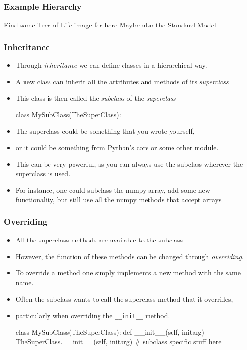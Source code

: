 \documentclass{beamer}
\begin{document}
\begin{frame}[fragile]
\frametitle{Example Hierarchy}
Find some Tree of Life image for here
Maybe also the Standard Model

\end{frame}

\begin{frame}[fragile]
\frametitle{Inheritance}
\begin{itemize}
\item Through \emph{inheritance} we can define classes in a hierarchical way.
\item A new class can inherit all the attributes and methods of its \emph{superclass}
\item This class is then called the \emph{subclass} of the \emph{superclass}
\begin{code}
  class MySubClass(TheSuperClass):
\end{code}
\item The superclass could be something that you wrote yourself,
\item or it could be something from Python's core or some other module.
\item This can be very powerful, as you can always use the subclass wherever the superclass is used.
\item For instance, one could subclass the numpy array, add some new functionality, 
but still use all the numpy methods that accept arrays.

\end{itemize}


\end{frame}

\begin{frame}[fragile]
\frametitle{Overriding}

\begin{itemize}
\item All the superclass methods are available to the subclass.
\item However, the function of these methods can be changed through \emph{overriding}.
\item To override a method one simply implements a new method with the same name.
\item Often the subclass wants to call the superclass method that it overrides,
\item particularly when overriding the \lstinline|__init__| method.
\begin{code}
  class MySubClass(TheSuperClass):
    def __init__(self, initarg)
      TheSuperClass.__init__(self, initarg)
      # subclass specific stuff here
\end{code}
\end{itemize}

\end{frame}
\end{document}
